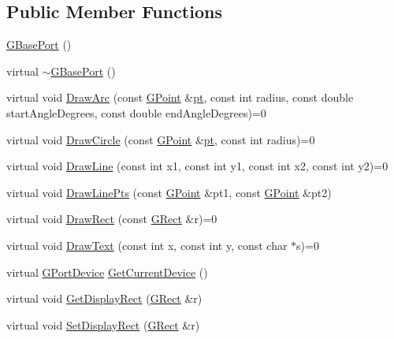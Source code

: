 \subsection*{Public Member Functions}
\begin{DoxyCompactItemize}
\item 
\mbox{\hyperlink{class_g_base_port_a3bd74a4fc4533f7033dd6697896f764c}{G\+Base\+Port}} ()
\item 
virtual \mbox{\hyperlink{class_g_base_port_ae8161e4d35bfa6bde771a77cbbde4183}{$\sim$\+G\+Base\+Port}} ()
\item 
virtual void \mbox{\hyperlink{class_g_base_port_af9375a9f4cd1bc94ac70eb71c437835a}{Draw\+Arc}} (const \mbox{\hyperlink{class_g_point}{G\+Point}} \&\mbox{\hyperlink{rings_8cpp_af69bbacaaf68a115b351c5d1e29c3cc8}{pt}}, const int radius, const double start\+Angle\+Degrees, const double end\+Angle\+Degrees)=0
\item 
virtual void \mbox{\hyperlink{class_g_base_port_a7dbdd13c9a8f60537e7915a7991ab0f0}{Draw\+Circle}} (const \mbox{\hyperlink{class_g_point}{G\+Point}} \&\mbox{\hyperlink{rings_8cpp_af69bbacaaf68a115b351c5d1e29c3cc8}{pt}}, const int radius)=0
\item 
virtual void \mbox{\hyperlink{class_g_base_port_a9e19a5d97e629c3d19be31e1938504c1}{Draw\+Line}} (const int x1, const int y1, const int x2, const int y2)=0
\item 
virtual void \mbox{\hyperlink{class_g_base_port_ad176b1ff88c4c0a29d51869b13a288d2}{Draw\+Line\+Pts}} (const \mbox{\hyperlink{class_g_point}{G\+Point}} \&pt1, const \mbox{\hyperlink{class_g_point}{G\+Point}} \&pt2)
\item 
virtual void \mbox{\hyperlink{class_g_base_port_a40b25399150458e4f41d4ed6b2f31f16}{Draw\+Rect}} (const \mbox{\hyperlink{class_g_rect}{G\+Rect}} \&r)=0
\item 
virtual void \mbox{\hyperlink{class_g_base_port_a9b947d2575b05f303520fbbe7fd9e350}{Draw\+Text}} (const int x, const int y, const char $\ast$s)=0
\item 
virtual \mbox{\hyperlink{gport_8h_a595e501a3b83fde14c760260fbfb153f}{G\+Port\+Device}} \mbox{\hyperlink{class_g_base_port_aeca5105700149693465fb5dbc43c9bbc}{Get\+Current\+Device}} ()
\item 
virtual void \mbox{\hyperlink{class_g_base_port_a2d6dd3aa5ad82b26ed614e139c2f6b8f}{Get\+Display\+Rect}} (\mbox{\hyperlink{class_g_rect}{G\+Rect}} \&r)
\item 
virtual void \mbox{\hyperlink{class_g_base_port_a8ac5424f05a6b6b982e570aae0802087}{Set\+Display\+Rect}} (\mbox{\hyperlink{class_g_rect}{G\+Rect}} \&r)

\end{DoxyCompactItemize}
